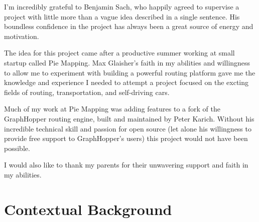 \documentclass[ %
                    author={Alexander Hill},
                supervisor={Dr. Benjamin Sach},
                    degree={MEng},
                     title={MARMOSET},
                  subtitle={Multi-Agent Route Management using Online Simulation for Efficient Transportation},
                      type={research},
                      year={2016} ]{dissertation}
\begin{document}
I'm incredibly grateful to Benjamin Sach, who happily agreed to supervise a
project with little more than a vague idea described in a single sentence. His
boundless confidence in the project has always been a great source of energy and
motivation.

The idea for this project came after a productive summer working at small
startup called Pie Mapping. Max Glaisher's faith in my abilities and willingness
to allow me to experiment with building a powerful routing platform gave me the
knowledge and experience I needed to attempt a project focused on the excting
fields of routing, transportation, and self-driving cars.

Much of my work at Pie Mapping was adding features to a fork of the GraphHopper
routing engine, built and maintained by Peter Karich. Without his incredible
technical skill and passion for open source (let alone his willingness to
provide free support to GraphHopper's users) this project would not have been possible.

I would also like to thank my parents for their unwavering support and faith in
my abilities.



%

\mainmatter


\chapter{Contextual Background}
\label{chap:context}
\end{document}
